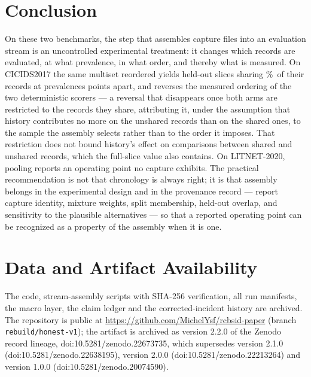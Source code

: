 \documentclass[manuscript,screen,nonacm]{acmart}
\begin{document}
\section{Conclusion}
\label{sec:conclusion}

On these two benchmarks, the step that assembles capture files into an
evaluation stream is an uncontrolled experimental treatment: it changes which
records are evaluated, at what prevalence, in what order, and thereby what is
measured. On CICIDS2017 the same multiset reordered yields held-out slices
sharing \CicidsHeldoutOverlapPct\%\ of their records at prevalences
\SFourCicidsPrevShiftAbsPp{} points apart, and reverses the measured ordering
of the two deterministic scorers --- a reversal that disappears once both arms
are restricted to the records they share, attributing it, under the assumption
that history contributes no more on the unshared records than on the shared
ones, to the sample the assembly selects rather than to the order it imposes.
That restriction does not bound history's effect on comparisons between shared
and unshared records, which the full-slice value also contains. On LITNET-2020,
pooling reports an operating point no capture exhibits. The practical recommendation is not that chronology
is always right; it is that assembly belongs in the experimental design and in
the provenance record --- report capture identity, mixture weights, split
membership, held-out overlap, and sensitivity to the plausible alternatives ---
so that a reported operating point can be recognized as a property of the
assembly when it is one.

\section*{Data and Artifact Availability}
The code, stream-assembly scripts with SHA-256 verification, all run manifests,
the macro layer, the claim ledger and the corrected-incident history are
archived. The repository is public at
\url{https://github.com/MichelYsf/rcbsid-paper} (branch \texttt{rebuild/honest-v1}); the artifact is archived as version 2.2.0 of the Zenodo record lineage, doi:10.5281/zenodo.22673735, which supersedes version 2.1.0 (doi:10.5281/zenodo.22638195), version 2.0.0 (doi:10.5281/zenodo.22213264) and version 1.0.0 (doi:10.5281/zenodo.20074590).
\end{document}
